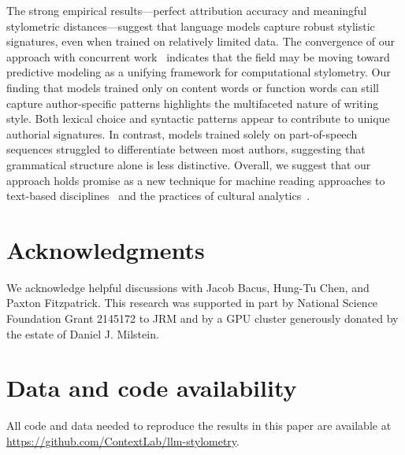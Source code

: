 \documentclass[11pt]{article}
\begin{document}
The strong empirical results---perfect attribution accuracy and meaningful
stylometric distances---suggest that language models capture robust stylistic
signatures, even when trained on relatively limited data. The convergence of
our approach with concurrent work~\citep{HuanEtal25,Reza25} indicates that the
field may be moving toward predictive modeling as a unifying framework for
computational stylometry. Our finding that models trained only on content words
or function words can still capture author-specific patterns highlights the
multifaceted nature of writing style. Both lexical choice and syntactic
patterns appear to contribute to unique authorial signatures. In contrast,
models trained solely on part-of-speech sequences struggled to differentiate
between most authors, suggesting that grammatical structure alone is less
distinctive. Overall, we suggest that our approach holds promise as a new
technique for machine reading approaches to text-based
disciplines~\citep{More17,More00,Holm98} and the practices of cultural
analytics~\citep{UndeEtal13}.

\section*{Acknowledgments}

We acknowledge helpful discussions with Jacob Bacus, Hung-Tu Chen, and Paxton
Fitzpatrick. This research was supported in part by National Science Foundation
Grant 2145172 to JRM and by a GPU cluster generously donated by the estate of
Daniel J. Milstein.

\section*{Data and code availability}

All code and data needed to reproduce the results in this paper are available
at \url{https://github.com/ContextLab/llm-stylometry}.


\end{document}
